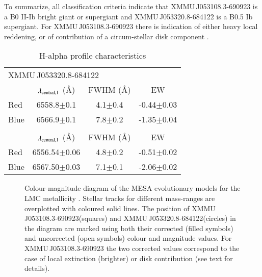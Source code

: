 \documentclass[a4paper,fleqn,usenatbib]{mnras}
\newcommand{\canda}{XMMU\,J053108.3-690923\xspace} %
\newcommand{\candb}{XMMU\,J053320.8-684122\xspace} %
\begin{document}
To summarize, all classification criteria indicate that \canda is a B0 II-Ib bright giant or supergiant and \candb is a B0.5 Ib supergiant. For \canda there is indication of either heavy local reddening, or of contribution of a circum-stellar disk component \citep[even present in supergiant systems;][]{2017arXiv171002585M}.







\begin{table}
 \centering 
 \caption {H-alpha profile characteristics}
 	\label{tab:ha}
 \begin{tabular}{lccc}
\hline
\multicolumn{4}{l}{ \candb}\\
& $\lambda_{\rm central,1}$ (\AA) & FWHM (\AA) & EW \\
\hline
Red & 6558.8$\pm$0.1 &  4.1$\pm$0.4 & -0.44$\pm$0.03\\
Blue & 6566.9$\pm$0.1 &  7.8$\pm$0.2  & -1.35$\pm$0.04\\
\hline
\hline \noalign{\smallskip}
\multicolumn{4}{l}{ \canda}\\
& $\lambda_{\rm central,1}$ (\AA) & FWHM (\AA) & EW \\
\hline
Red & 6556.54$\pm$0.06 & 4.8$\pm$0.2 & -0.51$\pm$0.02 \\
Blue & 6567.50$\pm$0.03 & 7.1$\pm$0.1 & -2.06$\pm$0.02 \\
\hline 

\end{tabular}
\end{table}



\begin{figure}
  \caption{Colour-magnitude diagram of the MESA evolutionary models for the LMC metallicity \citep{2016ApJ...823..102C,2016ApJS..222....8D}. Stellar tracks for different mass-ranges are overplotted with coloured solid lines. The position of \canda (squares) and \candb (circles) in the diagram are marked using both their corrected (filled symbols) and uncorrected (open symbols) colour and magnitude values. For \canda the two corrected values correspond to the case of local extinction (brighter) or disk contribution (see text for details).}
  \label{fig:mist}
\end{figure}
\end{document}
